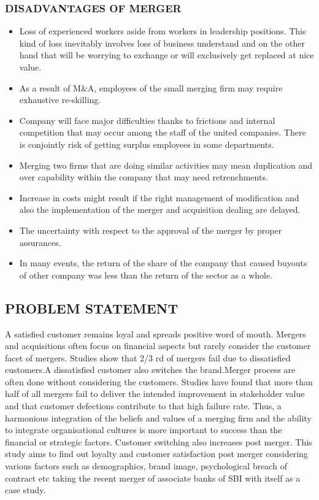 \documentclass[a4paper, 12pt]{extarticle}
\begin{document}
{\subsubsection{DISADVANTAGES OF MERGER}
\begin{itemize}
\item Loss of experienced workers aside from workers in leadership positions. This kind of loss inevitably involves loss of business understand and on the other hand that will be worrying to exchange or will exclusively get replaced at nice value.
\item As a result of M\&A, employees of the small merging firm may require exhaustive re-skilling.
\item Company will face major difficulties thanks to frictions and internal competition that may occur among the staff of the united companies. There is conjointly risk of getting surplus employees in some departments.
\item Merging two firms that are doing similar activities may mean duplication and over capability within the company that may need retrenchments.
\item Increase in costs might result if the right management of modification and also the implementation of the merger and acquisition dealing are delayed.
\item The uncertainty with respect to the approval of the merger by proper assurances.
\item In many events, the return of the share of the company that caused buyouts of other company was less than the return of the sector as a whole.
\end{itemize}

\subsection{PROBLEM STATEMENT}
\par A satisfied customer remains loyal and spreads positive word of mouth. Mergers and acquisitions often focus on financial aspects but rarely consider the customer facet of mergers. Studies show that 2/3 rd of mergers fail due to dissatisfied customers.A dissatisfied customer also switches the brand.Merger process are often done without considering the customers. Studies have found that more than half of all mergers fail to deliver the intended improvement in stakeholder value and that customer defections contribute to that high failure rate. Thus, a harmonious integration of the beliefs and values of a merging firm and the ability to integrate organisational cultures is more important to success than the financial or strategic factors. Customer switching also increases post merger. This study aims to find out loyalty and customer satisfaction post merger considering various factors such as demographics, brand image, psychological breach of contract etc taking the recent merger of associate banks of SBI with itself as a case study.

}
\end{document}
